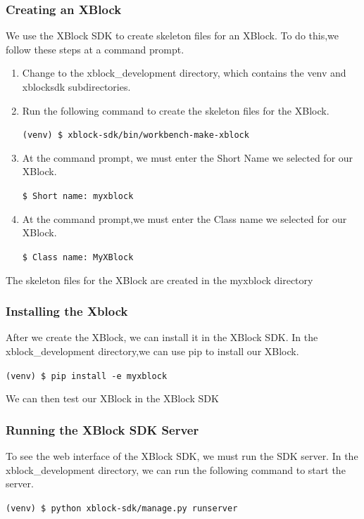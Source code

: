 \subsubsection{Creating an XBlock}
We use the XBlock SDK to create skeleton files for an XBlock. To do this,we follow
these steps at a command prompt.
\begin{enumerate}
\item Change to the xblock\_development directory, which contains the venv and xblocksdk
subdirectories.
\item Run the following command to create the skeleton files for the XBlock.
\begin{center}\verb=(venv) $ xblock-sdk/bin/workbench-make-xblock=\end{center}
\item At the command prompt, we must enter the Short Name we selected for our XBlock.
\begin{center}\verb=$ Short name: myxblock=\end{center}
\item At the command prompt,we must enter the Class name we selected for our XBlock.
\begin{center}\verb=$ Class name: MyXBlock=\end{center}
\end{enumerate}
The skeleton files for the XBlock are created in the myxblock directory

\subsubsection{Installing the Xblock}

After we create the XBlock, we can install it in the XBlock SDK.
In the xblock\_development directory,we can use pip to install our XBlock.
\begin{center}\verb=(venv) $ pip install -e myxblock=\end{center}
We can then test our XBlock in the XBlock SDK

\subsubsection{Running the XBlock SDK Server}
To see the web interface of the XBlock SDK, we must run the SDK server.
In the xblock\_development directory, we can run the following command to start
the server.
\begin{center}\verb=(venv) $ python xblock-sdk/manage.py runserver=\end{center}


